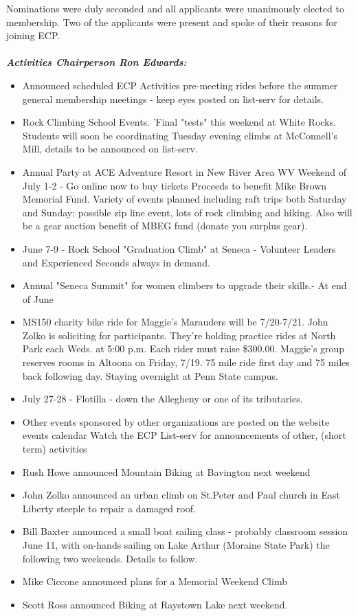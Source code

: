 \documentclass[10pt,a4paper]{article}
\begin{document}
\begin{multicols}{2}
Nominations were duly seconded and all applicants were unanimously elected to membership. Two of the applicants were present and spoke of their reasons for joining ECP.\\
\\
\textit{\textbf{Activities Chairperson Ron Edwards: }} 
\begin{itemize}
\item Announced scheduled ECP Activities pre-meeting rides before the summer general membership meetings - keep eyes posted on list-serv for details.
\item Rock Climbing School Events.  'Final "tests" this weekend at White Rocks. Students will soon be coordinating Tuesday evening climbs at McConnell's Mill,   details to be announced on list-serv.
\item Annual Party at ACE Adventure Resort in New River Area WV  Weekend of July 1-2 - Go online now to buy tickets  Proceeds to benefit Mike Brown Memorial Fund. Variety of events planned including raft trips both Saturday and Sunday; possible zip line event, lots of rock climbing and hiking. Also will be a gear auction benefit of MBEG fund
(donate you surplus gear).
\item June 7-9 - Rock School "Graduation Climb" at Seneca - Volunteer Leaders and Experienced Seconds always in demand.
\item Annual "Seneca Summit" for women climbers to upgrade their skills.- At end of June
\item MS150 charity bike ride for Maggie's Marauders will be 7/20-7/21.  John Zolko is soliciting for participants. They're holding practice rides at North Park each Weds. at 5:00 p.m. Each rider must raise \$300.00. Maggie's group reserves rooms in Altoona on Friday, 7/19.  75 mile ride first day and 75 miles back following day. Staying overnight at Penn State campus.
\item July 27-28 - Flotilla - down the Allegheny or one of its tributaries.
\item Other events sponsored by other organizations are posted on the website events calendar
Watch the ECP List-serv for announcements of other, (short term) activities
\item Rush Howe announced  Mountain Biking at Bavington next weekend
\item John Zolko announced an urban climb on St.Peter and Paul church in East Liberty steeple to repair a damaged roof.
\item Bill Baxter announced a small boat sailing class -  probably classroom session June 11, with on-hands sailing on Lake Arthur  (Moraine State Park) the following two weekends. Details to follow.
\item Mike Ciccone announced plans for a Memorial Weekend Climb
\item Scott Ross announced Biking at Raystown Lake next weekend.
\end{itemize}


\end{multicols}
\end{document}
